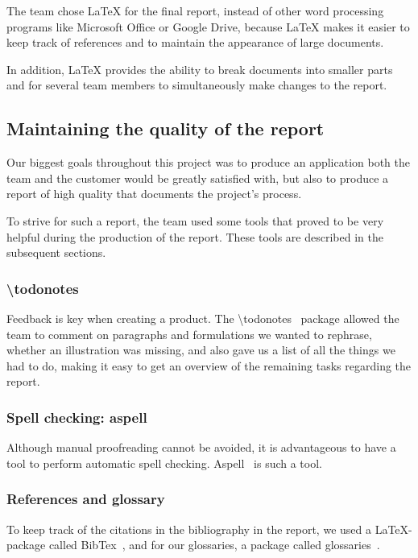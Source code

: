 The team chose LaTeX for the final report, instead of other word processing programs like Microsoft Office or Google Drive, because LaTeX makes it easier to keep track of references and to maintain the appearance of large
documents. 

In addition, LaTeX provides the ability to break documents into smaller parts and for several team members to simultaneously make changes to the report.

\subsection{Maintaining the quality of the report}
Our biggest goals throughout this project was to produce an application both the team and the customer would be greatly satisfied with, but also to produce a report of high quality that documents the project's process. 

To strive for such a report, the team used some tools that proved to be very helpful during the production of the report. These tools are described in the subsequent sections.

\subsubsection{\textbackslash todonotes}
Feedback is key when creating a product. The \textbackslash todonotes~\cite{todo} package allowed the team to comment on paragraphs and formulations we wanted to rephrase, whether an illustration was missing, and also gave us a list of all the things we had to do, making it easy to get an overview of the remaining tasks regarding the report.

\subsubsection{Spell checking: aspell}
Although manual proofreading cannot be avoided, it is advantageous to have a tool to perform automatic spell checking. Aspell~\cite{aspell} is such a tool.

\subsubsection{References and glossary}
To keep track of the citations in the bibliography in the report, we used a LaTeX-package called BibTex~\cite{bibtex}, and for our glossaries, a package called glossaries~\cite{glossaries}.


